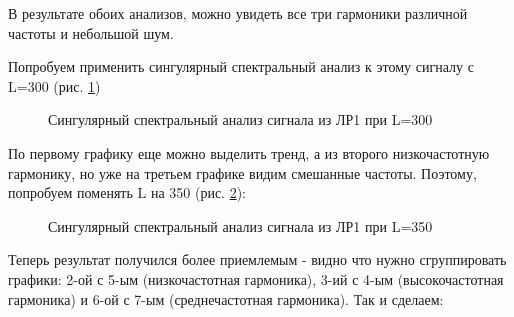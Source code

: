 \documentclass[a4paper,oneside,14pt]{extreport}
\begin{document}
В результате обоих анализов, можно увидеть все три гармоники различной частоты и небольшой шум.

\newpage
Попробуем применить сингулярный спектральный анализ к этому сигналу с L=300 (рис. \ref{task3_ssa2_300})

\begin{figure}[!h]
	\caption{Сингулярный спектральный анализ сигнала из ЛР1 при L=300}
	\label{task3_ssa2_300}
\end{figure}

По первому графику еще можно выделить тренд, а из второго низкочастотную гармонику, но уже на третьем графике видим смешанные частоты. Поэтому, попробуем поменять L на 350 (рис. \ref{task3_ssa2_350}):

\begin{figure}[!h]
	\caption{Сингулярный спектральный анализ сигнала из ЛР1 при L=350}
	\label{task3_ssa2_350}
\end{figure}

\newpage
Теперь результат получился более приемлемым - видно что нужно сгруппировать графики: 2-ой с 5-ым (низкочастотная гармоника), 3-ий с 4-ым (высокочастотная гармоника) и 6-ой с 7-ым (среднечастотная гармоника). Так и сделаем:
\end{document}
